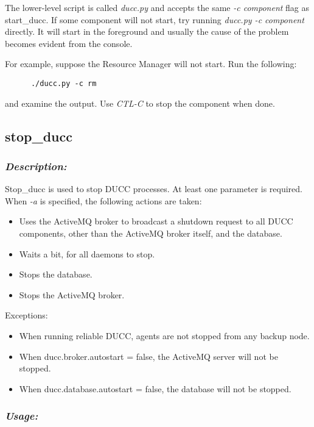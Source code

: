       The lower-level script is called {\em ducc.py} and accepts the same {\em -c component} flag as
      start\_ducc.  If some component will not start, try running {\em ducc.py -c component} directly.
      It will start in the foreground and usually the cause of the problem becomes evident from
      the console.

      For example, suppose the Resource Manager will not start.  Run the following:
\begin{verbatim}
      ./ducc.py -c rm
\end{verbatim}
      and examine the output.  Use {\em CTL-C} to stop the component when done.
      

\subsection{stop\_ducc}
\label{subsec:admin.stop-ducc}

    \subsubsection{{\em Description:}}
    Stop\_ducc is used to stop DUCC processes. At least one parameter is required.
    When {\em -a} is specified, the following actions are taken:
    \begin{itemize}
       \item Uses the ActiveMQ broker to broadcast a shutdown request to all
        DUCC components, other than the ActiveMQ broker itself, and the database.
      \item Waits a bit, for all daemons to stop.
      \item Stops the database.
      \item Stops the ActiveMQ broker.
    \end{itemize}

    Exceptions:
    \begin{itemize}
      \item When running reliable DUCC, agents are not stopped from any backup node.
      \item When ducc.broker.autostart = false, the ActiveMQ server will not be stopped.
      \item When ducc.database.autostart = false, the database will not be stopped.
    \end{itemize}
    
    \subsubsection{\em Usage:}

